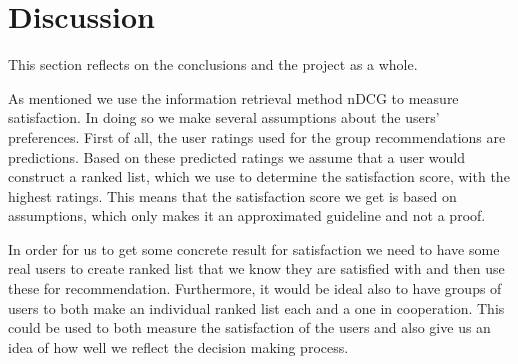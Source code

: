\section{Discussion}\label{sec:conclusion_discussion}
This section reflects on the conclusions and the project as a whole.

As mentioned we use the information retrieval method nDCG to measure satisfaction. In doing so we make several assumptions about the users’ preferences. First of all, the user ratings used for the group recommendations are predictions. Based on these predicted ratings we assume that a user would construct a ranked list, which we use to determine the satisfaction score, with the highest ratings. This means that the satisfaction score we get is based on assumptions, which only makes it an approximated guideline and not a proof.

In order for us to get some concrete result for satisfaction we need to have some real users to create ranked list that we know they are satisfied with and then use these for recommendation. Furthermore, it would be ideal also to have groups of users to both make an individual ranked list each and a one in cooperation. This could be used to both measure the satisfaction of the users and also give us an idea of how well we reflect the decision making process.